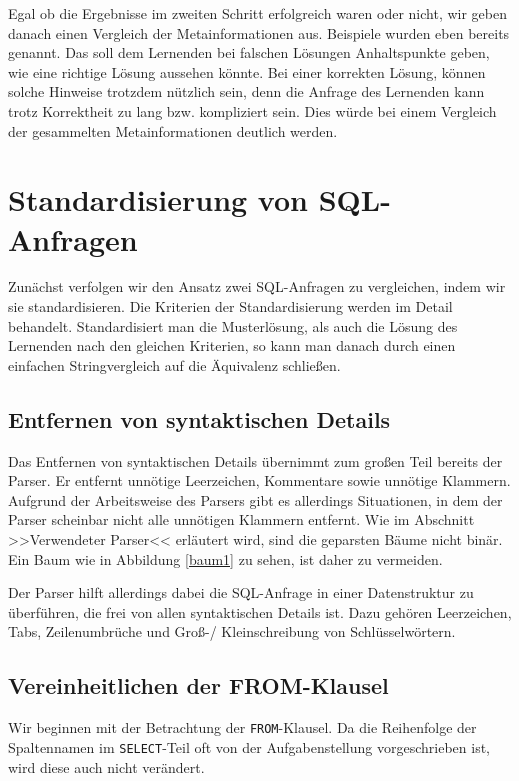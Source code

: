 Egal ob die Ergebnisse im zweiten Schritt erfolgreich waren oder nicht, wir geben danach einen Vergleich der Metainformationen aus. Beispiele wurden eben bereits genannt. Das soll dem Lernenden bei falschen Lösungen Anhaltspunkte geben, wie eine richtige Lösung aussehen könnte. Bei einer korrekten Lösung, können solche Hinweise trotzdem nützlich sein, denn die Anfrage des Lernenden kann trotz Korrektheit zu lang bzw. kompliziert sein. Dies würde bei einem Vergleich der gesammelten Metainformationen deutlich werden.

\section{Standardisierung von SQL-Anfragen}

Zunächst verfolgen wir den Ansatz zwei SQL-Anfragen zu vergleichen, indem wir sie standardisieren. Die Kriterien der Standardisierung werden im Detail behandelt. Standardisiert man die Musterlösung, als auch die Lösung des Lernenden nach den gleichen Kriterien, so kann man danach durch einen einfachen Stringvergleich auf die Äquivalenz schließen. 

\subsection{Entfernen von syntaktischen Details}

Das Entfernen von syntaktischen Details übernimmt zum großen Teil bereits der Parser. Er entfernt unnötige Leerzeichen, Kommentare sowie unnötige Klammern. Aufgrund der Arbeitsweise des Parsers gibt es allerdings Situationen, in dem der Parser scheinbar nicht alle unnötigen Klammern entfernt. Wie im Abschnitt >>Verwendeter Parser<< erläutert wird, sind die geparsten Bäume nicht binär. Ein Baum wie in Abbildung \ref{baum1} zu sehen, ist daher zu vermeiden. 

Der Parser hilft allerdings dabei die SQL-Anfrage in einer Datenstruktur zu überführen, die frei von allen syntaktischen Details ist. Dazu gehören Leerzeichen, Tabs, Zeilenumbrüche und Groß-/ Kleinschreibung von Schlüsselwörtern.

\subsection{Vereinheitlichen der FROM-Klausel}

Wir beginnen mit der Betrachtung der \verb|FROM|-Klausel. Da die Reihenfolge der Spaltennamen im \verb|SELECT|-Teil oft von der Aufgabenstellung vorgeschrieben ist, wird diese auch nicht verändert.

